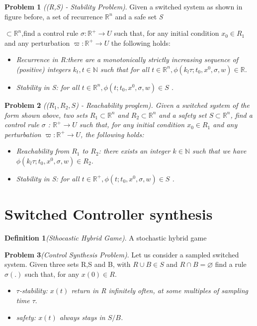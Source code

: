  \textbf{Problem 1} \emph{((R,S) - Stability Problem)}. Given a 
 switched system as shown in figure before, a set of recurrence 
 ${\mathbb{R}^n}$ and a safe set \emph{S}
 
 ${\subset \mathbb{R}^n}$,find a control rule 
 ${\sigma : \mathbb{R}^+ \rightarrow U}$ such that, for any
  initial condition ${x_0  \in  R_1}$ and any perturbation 
  ${\varpi :\mathbb{R}^+\rightarrow U}$  the
   following holds:
 
 \begin{itemize}
    \item \emph{ Recurrence in \emph{R}:there are a monotonically 
    strictly increasing sequence of (positive) integers
    ${k_t, t \in \mathbb{N}}$ such that for all ${ t \in \mathbb{R}^n,
    \phi(k_l\tau;t_0,x^0,\sigma,w) \in \mathbb{R} }$.}

    \item \emph{ Stability in \emph{S}: for all ${ t \in \mathbb{R}^n,
    \phi(t;t_0,x^0,\sigma,w) \in S}$ .}
\end{itemize}
 
 
 \textbf{Problem 2} \emph{((${R_1,R_2,S}$) - Reachability proglem).
  Given a switched system of the form shown above, two sets  
  ${ R_1 \subset \mathbb{R}^n}$  and ${ R_2 \subset \mathbb{R}^n}$ 
 and a safety set  ${S \subset  \mathbb{R}^n}$, find a control rule 
 ${\sigma}$ :
  ${\mathbb{R}^+\rightarrow U}$ such that, for any initial condition 
  ${x_0  \in  R_1}$ and any perturbation  ${\varpi : \mathbb{R}^+  
  \rightarrow U}$, the following holds:}
 
 \begin{itemize}
    \item  \emph{Reachability from ${R_1}$ to ${R_2}$: there exists 
    an integer ${k \in \mathbb{N} }$ such that we have ${ \phi( k_l\tau
    ;t_0,x^0,\sigma,w) \in R_2 }$.}
    
    \item \emph{ Stability in S: for all ${ t \in \mathbb{R}^+, 
    \phi(t;t_0,x^0,\sigma,w) \in S}$ .}
\end{itemize}
 
 \section{Switched Controller synthesis}

\textbf{Definition 1}\emph{(Sthocastic Hybrid Game)}. A stochastic
 hybrid game 
 
\textbf{Problem 3}\emph{(Control Synthesis Problem)}. Let us 
consider a sampled switched system. Given three sets R,S and B, 
with ${R \cup B \in S}$  and ${R \cap B = \varnothing }$ find a 
rule ${\sigma(.)}$ such that, for any ${x(0) \in R }$. 

\begin{itemize}
    \item \emph{ ${\tau}$-stability: ${x(t)}$ return in R 
    infinitely often, at some multiples of sampling time ${\tau}$}.
    \item \emph{ safety: ${x(t)}$ always stays in ${S/B}$.}
\end{itemize}




